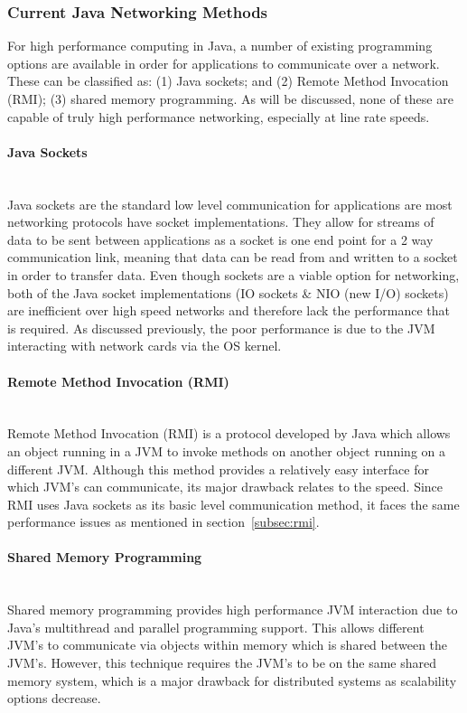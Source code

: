 \documentclass[interim_report.tex]{subfiles}
\begin{document}
\subsubsection{Current Java Networking Methods}
For high performance computing in Java, a number of existing programming options are available in order for applications to communicate over a network. These can be classified as: (1) Java sockets; and (2) Remote Method Invocation (RMI); (3) shared memory programming. As will be discussed, none of these are capable of truly high performance networking, especially at line rate speeds.

\paragraph{Java Sockets}\mbox{}\\ %
Java sockets are the standard low level communication for applications are most networking protocols have socket implementations. They allow for streams of data to be sent between applications as a socket is one end point for a 2 way communication link, meaning that data can be read from and written to a socket in order to transfer data. Even though sockets are a viable option for networking, both of the Java socket implementations (IO sockets \& NIO (new I/O) sockets) are inefficient over high speed networks \cite{sockets} and therefore lack the performance that is required. As discussed previously, the poor performance is due to the JVM interacting with network cards via the OS kernel.

\paragraph{Remote Method Invocation (RMI)}\mbox{}\\ %
\label{subsec:rmi}
Remote Method Invocation (RMI) is a protocol developed by Java which allows an object running in a JVM to invoke methods on another object running on a different JVM. Although this method provides a relatively easy interface for which JVM's can communicate, its major drawback relates to the speed. Since RMI uses Java sockets as its basic level communication method, it faces the same performance issues as mentioned in section~\ref{subsec:rmi}.

\paragraph{Shared Memory Programming}\mbox{}\\ %
Shared memory programming provides high performance JVM interaction due to Java's multithread and parallel programming support. This allows different JVM's to communicate via objects within memory which is shared between the JVM's. However, this technique requires the JVM's to be on the same shared memory system, which is a major drawback for distributed systems as scalability options decrease. \\
\end{document}
